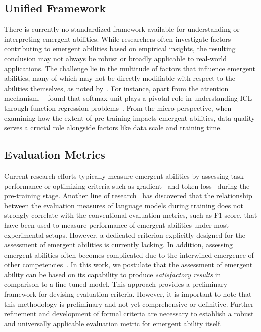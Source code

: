 \documentclass[11pt,a4paper]{article}
\begin{document}
\subsection{Unified Framework}
There is currently no standardized framework available for understanding or interpreting emergent abilities. 
While researchers often investigate factors contributing to emergent abilities based on empirical insights, the resulting conclusion may not always be robust or broadly applicable to real-world applications.
The challenge lie in the multitude of factors that influence emergent abilities, many of which may not be directly modifiable with respect to the abilities themselves, as noted by~\citet{Wei2022EmergentAO}.
For instance, apart from the attention mechanism, ~\citet{Li2023TheCO} found that softmax unit plays a pivotal role in understanding ICL through function regression problems~\cite{Garg2022WhatCT,Akyrek2023WHL,Oswald2022TransformersLI}. 
From the micro-perspective, when examining how the extent of pre-training impacts emergent abilities, data quality serves a crucial role alongside factors like data scale and training time.
 
\subsection{Evaluation Metrics}
Current research efforts typically measure emergent abilities by assessing task performance or optimizing criteria such as gradient~\cite{Oswald2022TransformersLI} and token loss~\cite{Olsson2022IncontextLA} during the pre-training stage.
Another line of research~\citep{Shin2022OnTE, Razeghi2022ImpactOP} has discovered that the relationship between the evaluation measures of language models during training does not strongly correlate with the conventional evaluation metrics, such as F1-score, that have been used to measure performance of emergent abilities under most experimental setups.
However, a dedicated criterion explicitly designed for the assessment of emergent abilities is currently lacking.
In addition, assessing emergent abilities often becomes complicated due to the interwined emergence of other competencies~\cite{Lu2023AreEA}.
In this work, we postulate that the assessment of emergent ability can be based on its capability to produce \textit{satisfactory results} in comparison to a fine-tuned model. 
This approach provides a preliminary framework for devising evaluation criteria. 
However, it is important to note that this methodology is preliminary and not yet comprehensive or definitive. 
Further refinement and development of formal criteria are necessary to establish a robust and universally applicable evaluation metric for emergent ability itself.
\end{document}
